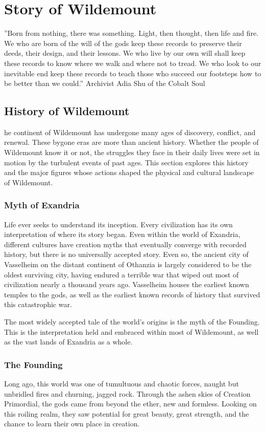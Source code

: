 \documentclass[10pt,a4paper,twoside,bg=print,twocolumn,openany,nodeprecatedcode]{dndbook}
\begin{document}
\chapter{Story of Wildemount}
\DndQuote%
{}
{''Born from nothing, there was something. Light, then thought, then life and fire. We who are born of the will of the gods keep these records to preserve their deeds, their design, and their lessons. We who live by our own will shall keep these records to know where we walk and where not to tread. We who look to our inevitable end keep these records to teach those who succeed our footsteps how to be better than we could.''}
{Archivist Adia Shu of the Cobalt Soul}
\section{History of Wildemount}
he continent of Wildemount has undergone many ages of discovery, conflict, and renewal. These bygone eras are more than ancient history. Whether the people of Wildemount know it or not, the struggles they face in their daily lives were set in motion by the turbulent events of past ages. This section explores this history and the major figures whose actions shaped the physical and cultural landscape of Wildemount.


\subsection{Myth of Exandria}
Life ever seeks to understand its inception. Every civilization has its own interpretation of where its story began. Even within the world of Exandria, different cultures have creation myths that eventually converge with recorded history, but there is no universally accepted story. Even so, the ancient city of Vasselheim on the distant continent of Othanzia is largely considered to be the oldest surviving city, having endured a terrible war that wiped out most of civilization nearly a thousand years ago. Vasselheim houses the earliest known temples to the gods, as well as the earliest known records of history that survived this catastrophic war.

The most widely accepted tale of the world's origins is the myth of the Founding. This is the interpretation held and embraced within most of Wildemount, as well as the vast lands of Exandria as a whole.

\subsection{The Founding}
Long ago, this world was one of tumultuous and chaotic forces, naught but unbridled fires and churning, jagged rock. Through the ashen skies of Creation Primordial, the gods came from beyond the ether, new and formless. Looking on this roiling realm, they saw potential for great beauty, great strength, and the chance to learn their own place in creation.
\end{document}
